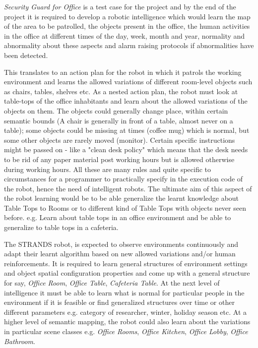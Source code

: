 \documentclass[letterpaper, 10 pt, conference]{ieeeconf}  %
\begin{document}
\textit{Security Guard for Office} is a test case for the project and by the end of the project it is required to develop a robotic intelligence which would learn the map of the area to be patrolled, the objects present in the office, the human activities in the office at different times of the day, week, month and year, normality and abnormality about these aspects and alarm raising protocols if abnormalities have been detected. 

This translates to an action plan for the robot in which it patrols the working environment and learns the allowed variations of different room-level objects such as chairs, tables, shelves etc. As a nested action plan, the robot must look at table-tops of the office inhabitants and learn about the allowed variations of the objects on them. The objects could generally change place, within certain semantic bounds (A chair is generally in front of a table, almost never on a table); some objects could be missing at times (coffee mug) which is normal, but some other objects are rarely moved (monitor). Certain specific instructions might be passed on - like a "clean desk policy" which means that the desk needs to be rid of any paper material post working hours but is allowed otherwise during working hours. All these are many rules and quite specific to circumstances for a programmer to practically specify in the execution code of the robot, hence the need of intelligent robots. The ultimate aim of this aspect of the robot learning would be to be able generalize the learnt knowledge about Table Tops to Rooms or to different kind of Table Tops with objects never seen before. e.g. Learn about table tops in an office environment and be able to generalize to table tops in a cafeteria.

The STRANDS robot, is expected to observe environments continuously and adapt their learnt algorithm based on new allowed variations and/or human reinforcements. It is required to learn general structures of environment settings and object spatial configuration properties and come up with a general structure for say, \textit{Office Room}, \textit{Office Table}, \textit{Cafeteria Table}. At the next level of intelligence it must be able to learn what is normal for particular people in the environment if it is feasible or find generalized structures over time or other different parameters e.g. category of researcher, winter, holiday season etc. At a higher level of semantic mapping, the robot could also learn about the variations in particular scene classes e.g. \textit{Office Rooms}, \textit{Office Kitchen}, \textit{Office Lobby}, \textit{Office Bathroom}.
\end{document}
